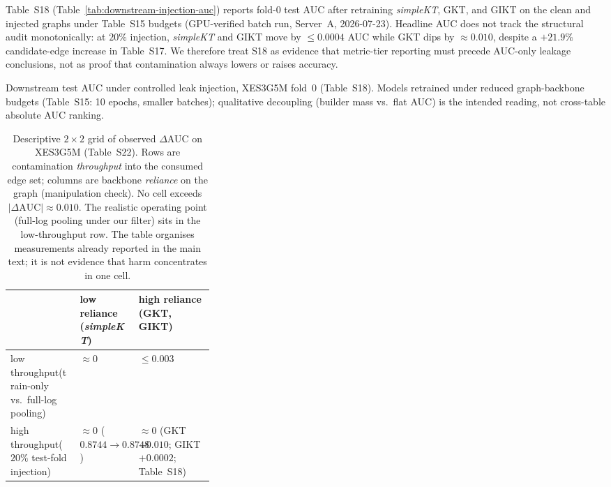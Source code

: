 \documentclass[preprint,11pt]{elsarticle}
\begin{document}
Table~S18 (Table~\ref{tab:downstream-injection-auc}) reports fold-0 test AUC
after retraining \textit{simpleKT}, GKT, and GIKT on the clean and injected
graphs under Table~S15 budgets (GPU-verified batch run, Server~A, 2026-07-23).
Headline AUC does not track the structural audit monotonically: at $20\%$
injection, \textit{simpleKT} and GIKT move by ${\leq}0.0004$ AUC while GKT
dips by ${\approx}0.010$, despite a ${+}21.9\%$ candidate-edge increase in
Table~S17. We therefore treat S18 as evidence that metric-tier reporting must
precede AUC-only leakage conclusions, not as proof that contamination always
lowers or raises accuracy.
\begin{table}[h!]
\centering
\caption{Downstream test AUC under controlled leak injection, XES3G5M fold~0 (Table~S18). Models retrained under reduced graph-backbone budgets (Table~S15: 10 epochs, smaller batches); qualitative decoupling (builder mass vs.\ flat AUC) is the intended reading, not cross-table absolute AUC ranking.}
\label{tab:downstream-injection-auc}

\end{table}

\begin{table}[h!]
\centering
\caption{Descriptive $2{\times}2$ grid of observed $\Delta$AUC on XES3G5M
(Table~S22). Rows are contamination \emph{throughput} into the consumed edge
set; columns are backbone \emph{reliance} on the graph (manipulation check).
No cell exceeds $|\Delta\text{AUC}|{\approx}0.010$. The realistic operating
point (full-log pooling under our filter) sits in the low-throughput row. The
table organises measurements already reported in the main text; it is not
evidence that harm concentrates in one cell.}
\label{tab:two-factor}
\footnotesize
\setlength{\tabcolsep}{4pt}
\begin{tabularx}{\linewidth}{@{} >{\RaggedRight\arraybackslash}p{0.34\linewidth}
  >{\centering\arraybackslash}X >{\centering\arraybackslash}X @{}}
\toprule
 & low reliance (\textit{simpleKT}) & high reliance (GKT, GIKT) \\
\midrule
low throughput\newline (train-only vs.\ full-log pooling) &
  ${\approx}0$ &
  ${\leq}0.003$ \\
high throughput\newline ($20\%$ test-fold injection) &
  ${\approx}0$ ($0.8744{\to}0.8748$) &
  ${\approx}0$ (GKT $-0.010$; GIKT $+0.0002$; Table~S18) \\
\bottomrule
\end{tabularx}
\end{table}
\end{document}
